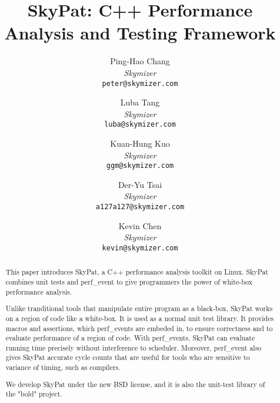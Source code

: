 \documentclass[final]{ols}
\begin{document}
\title{SkyPat: C++ Performance Analysis and Testing Framework}
\subtitle{}

\author{
	Ping-Hao Chang \\
	{\em Skymizer}\\
	{\tt\small peter@skymizer.com}\\
\and
	Luba Tang\\
	{\em Skymizer}\\
	{\tt\small luba@skymizer.com}\\
\and
	Kuan-Hung Kuo\\
	{\em Skymizer}\\
	{\tt\small ggm@skymizer.com}\\
\and
	Der-Yu Tsai\\
	{\em Skymizer}\\
	{\tt\small a127a127@skymizer.com}\\
\and
	Kevin Chen\\
	{\em Skymizer}\\
	{\tt\small kevin@skymizer.com}
}

\date{} %

\maketitle


\begin{abstract}
This paper introduces SkyPat, a C++ performance analysis toolkit on Linux. 
SkyPat combines unit tests and perf\_event to give programmers the power of white-box performance analysis.

Unlike tranditional tools that manipulate entire program as a black-box, SkyPat works on a region of code like a white-box.
It is used as a normal unit test library.
It provides macros and assertions, which perf\_events are embeded in, to ensure correctness and to evaluate performance of a region of code.
With perf\_events, SkyPat can evaluate running time precisely without interference to scheduler.
Moreover, perf\_event also gives SkyPat accurate cycle counts that are useful for tools who are sensitive to variance of timing, such as compilers.

We develop SkyPat under the new BSD license, and it is also the unit-test library of the "bold" project.
\end{abstract}
\end{document}
